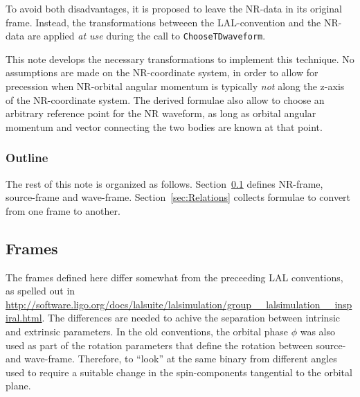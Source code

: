 \documentclass[aps,prd,amssymb,amsmath,amsfonts,superscriptaddress,
floatfix ,preprintnumbers,altaffilletter]{revtex4}
\begin{document}
To avoid both disadvantages, it is proposed to leave the NR-data in
its original frame.  Instead, the transformations betweeen the
LAL-convention and the NR-data are applied \emph{at use} during the
call to {\tt ChooseTDwaveform}.

This note develops the necessary transformations to implement this
technique.  No assumptions are made on the NR-coordinate system, in
order to allow for precession when NR-orbital angular momentum is
typically \emph{not} along the z-axis of the NR-coordinate system.
The derived formulae also allow to choose an arbitrary reference point
for the NR waveform, as long as orbital angular momentum and vector
connecting the two bodies are known at that point.


\subsubsection{Outline}

The rest of this note is organized as follows.
Section~\ref{sec:Frames} defines NR-frame, source-frame and
wave-frame.  Section~\ref{sec:Relations} collects formulae to convert
from one frame to another.

\subsection{Frames}
\label{sec:Frames}

The frames defined here differ somewhat from the preceeding LAL
conventions, as spelled out in
\url{http://software.ligo.org/docs/lalsuite/lalsimulation/group__lalsimulation__inspiral.html}.
The differences are needed to achive the separation between intrinsic
and extrinsic parameters.  In the old conventions, the orbital phase
$\phi$ was also used as part of the rotation parameters that define
the rotation between source- and wave-frame.  Therefore, to ``look''
at the same binary from different angles used to require a suitable
change in the spin-components tangential to the orbital plane.
\end{document}
